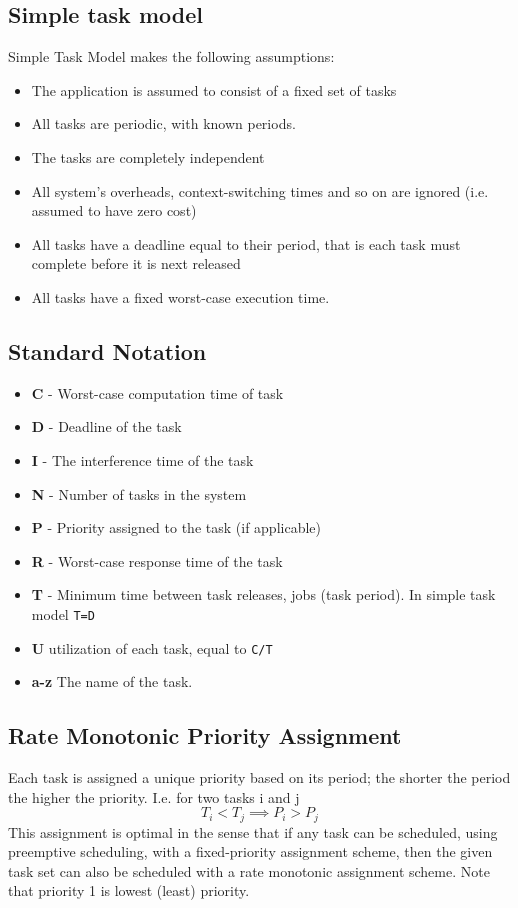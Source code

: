 \subsection{Simple task model}
Simple Task Model makes the following assumptions:
\begin{itemize}
\item The application is assumed to consist of a fixed set of tasks
\item All tasks are periodic, with known periods.
\item The tasks are completely independent
\item All system's overheads, context-switching times and so on are ignored (i.e. assumed to have zero cost)
\item All tasks have a deadline equal to their period, that is each task must complete before it is next released
\item All tasks have a fixed worst-case execution time.
\end{itemize}

\subsection{Standard Notation}
\begin{itemize}
\item \textbf{C} - Worst-case computation time of task
\item \textbf{D} - Deadline of the task
\item \textbf{I} - The interference time of the task
\item \textbf{N} - Number of tasks in the system
\item \textbf{P} - Priority assigned to the task (if applicable)
\item \textbf{R} - Worst-case response time of the task
\item \textbf{T} - Minimum time between task releases, jobs (task period). In simple task model \texttt{T=D}
\item \textbf{U} utilization of each task, equal to \texttt{C/T}
\item \textbf{a-z} The name of the task.
\end{itemize}

\subsection{Rate Monotonic Priority Assignment}
Each task is assigned a unique priority based on its period; the shorter the period the higher the priority. I.e. for two tasks i and j
\begin{equation}
T_i<T_j \implies P_i > P_j
\end{equation}
This assignment is optimal in the sense that if any task can be scheduled, using preemptive scheduling, with a fixed-priority assignment scheme, then the given task set can also be scheduled with a rate monotonic assignment scheme. Note that priority 1 is lowest (least) priority.

